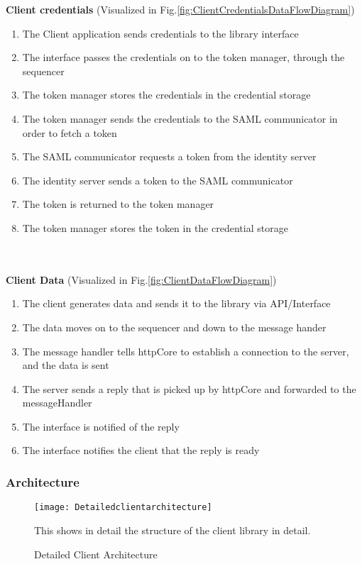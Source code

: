 	\textbf{Client credentials} (Visualized in Fig.\ref{fig:ClientCredentialsDataFlowDiagram})
		\begin{enumerate}
			\item The Client application sends credentials to the library interface
			\item The interface passes the credentials on to the token manager, through the sequencer
			\item The token manager stores the credentials in the credential storage
			\item The token manager sends the credentials to the SAML communicator in order to fetch a token
			\item The SAML communicator requests a token from the identity server
			\item The identity server sends a token to the SAML communicator
			\item The token is returned to the token manager
			\item The token manager stores the token in the credential storage
		\end{enumerate}
		\\\\	
		\textbf{Client Data} (Visualized in Fig.\ref{fig:ClientDataFlowDiagram})
		\begin{enumerate}
			\item The client generates data and sends it to the library via API/Interface
			\item The data moves on to the sequencer and down to the message hander
			\item The message handler tells httpCore to establish a connection to the server, and the data is sent
			\item The server sends a reply that is picked up by httpCore and forwarded to the messageHandler
			\item The interface is notified of the reply
			\item The interface notifies the client that the reply is ready
		\end{enumerate}
		
	\subsubsection{Architecture}\label{client architecture}
		\begin{figure}[h]
			\centering	
			\texttt{[image: Detailedclientarchitecture]}
			\caption{Detailed Client Architecture}
			This shows in detail the structure of the client library in detail. 
			\label{fig:DetailedClientArchitecture}
		\end{figure}

